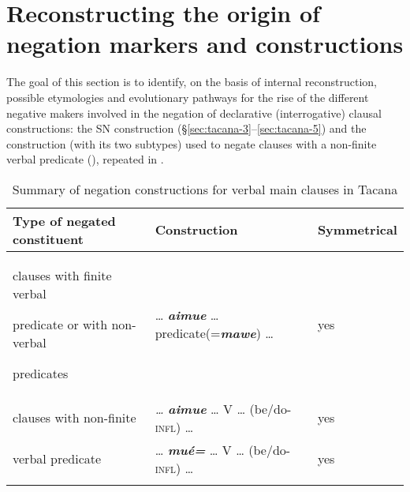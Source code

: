\documentclass[output=paper]{langsci/langscibook}
\begin{document}
\section{Reconstructing the origin of negation markers and constructions}\label{sec:tacana-10}

The goal of this section is to identify, on the basis of internal
reconstruction, possible etymologies and evolutionary pathways for the rise
of the different negative makers involved in the negation of
declarative (interrogative) clausal constructions: the SN construction
(§\ref{sec:tacana-3}--\ref{sec:tacana-5}) and the construction (with its
two subtypes) used to negate clauses with a non-finite verbal predicate
(), repeated in .

\begin{table}\begin{small}
\caption{Summary of negation constructions for verbal main clauses in Tacana}\label{tab:tacana-3}
\begin{tabularx}{\textwidth}{Qll}
\lsptoprule
Type of negated constituent & Construction & Symmetrical\\\midrule
clauses with finite verbal\newline \rule{0pt}{1ex}\hspace{2ex}predicate or with
non-verbal\newline \rule{0pt}{1ex}\hspace{2ex}predicates & … \textbf{\textit{aimue}} … predicate(=\textbf{\textit{mawe}}) … & yes\\
clauses with non-finite & \textit{…}
\textbf{\textit{aimue}} … V … (be/do-\textsc{infl}) … & yes \\
\hspace{2ex}verbal predicate & … \textbf{\textit{mué=}} … V … (be/do-\textsc{infl}) … & yes\\
\lspbottomrule
\end{tabularx}\end{small}\end{table}
\end{document}
